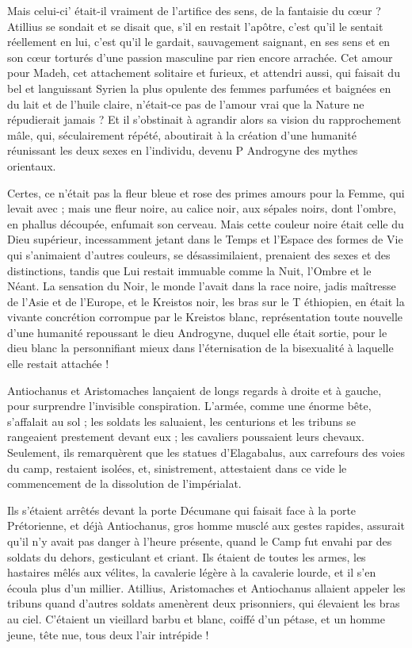 \documentclass[a4paper, 11pt, oneside, polutonikogreek, french]{article}
\begin{document}
Mais celui-ci' était-il vraiment de l'artifice des sens, de la fantaisie du cœur ? Atillius se sondait et se disait que, s'il en restait l'apôtre, c'est qu'il le sentait réellement en lui, c'est qu'il le gardait, sauvagement saignant, en ses sens et en son cœur torturés d'une passion masculine par rien encore arrachée. Cet amour pour Madeh, cet attachement solitaire et furieux, et attendri aussi, qui faisait du bel et languissant Syrien la plus opulente des femmes parfumées et baignées en du lait et de l'huile claire, n'était-ce pas de l'amour vrai que la Nature ne répudierait jamais ? Et il s'obstinait à agrandir alors sa vision du rapprochement mâle, qui, séculairement répété, aboutirait à la création d'une humanité réunissant les deux sexes en l'individu, devenu P Androgyne des mythes orientaux.

Certes, ce n'était pas la fleur bleue et rose des primes amours pour la Femme, qui levait avec ; mais une fleur noire, au calice noir, aux sépales noirs, dont l'ombre, en phallus découpée, enfumait son cerveau. Mais cette couleur noire était celle du Dieu supérieur, incessamment jetant dans le Temps et l'Espace des formes de Vie qui s'animaient d'autres couleurs, se désassimilaient, prenaient des sexes et des distinctions, tandis que Lui restait immuable comme la Nuit, l'Ombre et le Néant. La sensation du Noir, le monde l'avait dans la race noire, jadis maîtresse de l'Asie et de l'Europe, et le Kreistos noir, les bras sur le T éthiopien, en était la vivante concrétion corrompue par le Kreistos blanc, représentation toute nouvelle d'une humanité repoussant le dieu Androgyne, duquel elle était sortie, pour le dieu blanc la personnifiant mieux dans l'éternisation de la bisexualité à laquelle elle restait attachée !

Antiochanus et Aristomaches lançaient de longs regards à droite et à gauche, pour surprendre l'invisible conspiration. L'armée, comme une énorme bête, s'affalait au sol ; les soldats les saluaient, les centurions et les tribuns se rangeaient prestement devant eux ; les cavaliers poussaient leurs chevaux. Seulement, ils remarquèrent que les statues d'Elagabalus, aux carrefours des voies du camp, restaient isolées, et, sinistrement, attestaient dans ce vide le commencement de la dissolution de l'impérialat.

Ils s'étaient arrêtés devant la porte Décumane qui faisait face à la porte Prétorienne, et déjà Antiochanus, gros homme musclé aux gestes rapides, assurait qu'il n'y avait pas danger à l'heure présente, quand le Camp fut envahi par des soldats du dehors, gesticulant et criant. Ils étaient de toutes les armes, les hastaires mêlés aux vélites, la cavalerie légère à la cavalerie lourde, et il s'en écoula plus d'un millier. Atillius, Aristomaches et Antiochanus allaient appeler les tribuns quand d'autres soldats amenèrent deux prisonniers, qui élevaient les bras au ciel. C'étaient un vieillard barbu et blanc, coiffé d'un pétase, et un homme jeune, tête nue, tous deux l'air intrépide !
\end{document}
